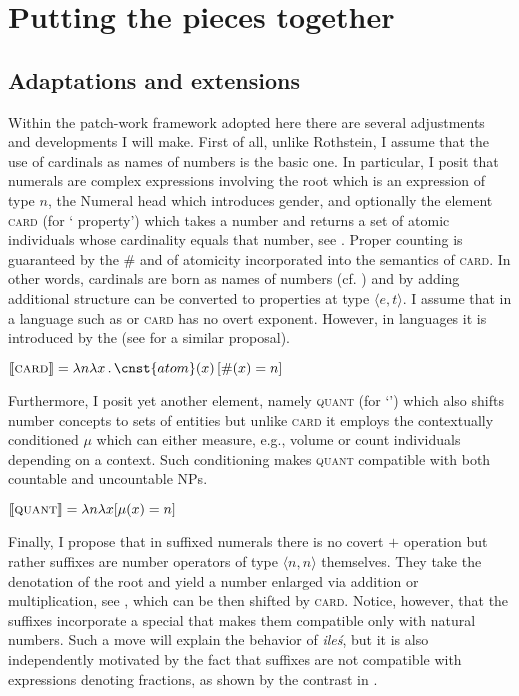 \documentclass[output=paper, newtxmath, colorlinks, citecolor=brown]{langsci/langscibook}
\begin{document}
	\section{Putting the pieces together}\label{sec:putting-pieces-together}

	\subsection{Adaptations and extensions}\label{sec:adaptations-and-extensions}


	Within the patch-work framework adopted here there are several adjustments and developments I will make. First of all, unlike Rothstein, I assume that the use of cardinals as names of numbers is the basic one. In particular, I posit that numerals are complex expressions involving the  root which is an expression of type $n$, the Numeral head which introduces gender, and optionally the  element \textsc{card} (for ` property') which takes a number and returns a set of atomic individuals whose cardinality equals that number, see . Proper counting is guaranteed by the $\#$  and  of atomicity incorporated into the semantics of \textsc{card}. In other words, cardinals are born as names of numbers (cf. \citealt{scha1981distributive}) and by adding additional structure can be converted to  properties at type $\langle e,t\rangle$. I assume that in a language such as  or  \textsc{card} has no overt exponent. However, in  languages it is introduced by the  (see \citealt{sudo2016semantic} for a similar proposal).

	\ea $\llbracket\textsc{card}\rrbracket=\lambda n\lambda x\,.\,\cnst{atom}(x)\,[\#(x)=n]$\label{ex:card}
	\z

\noindent Furthermore, I posit yet another  element, namely \textsc{quant} (for `') which also shifts number concepts to sets of entities but unlike \textsc{card} it employs the contextually conditioned  $\mu$ which can either measure, e.g., volume or count individuals depending on a context. Such conditioning makes \textsc{quant} compatible with both countable and uncountable NPs.

	\ea $\llbracket\textsc{quant}\rrbracket=\lambda n\lambda x[\mu(x)=n]$\label{ex:quant}
	\z

\noindent Finally, I propose that in  suffixed numerals there is no covert $+$ operation but rather  suffixes are number operators of type $\langle n,n\rangle$ themselves. They take the denotation of the  root and yield a number enlarged via addition or multiplication, see , which can be then shifted by \textsc{card}. Notice, however, that the  suffixes incorporate a special  that makes them compatible only with natural numbers. Such a move will explain the behavior of \textit{ileś}, but it is also independently motivated by the fact that  suffixes are not compatible with expressions denoting fractions, as shown by the contrast in .
\end{document}
